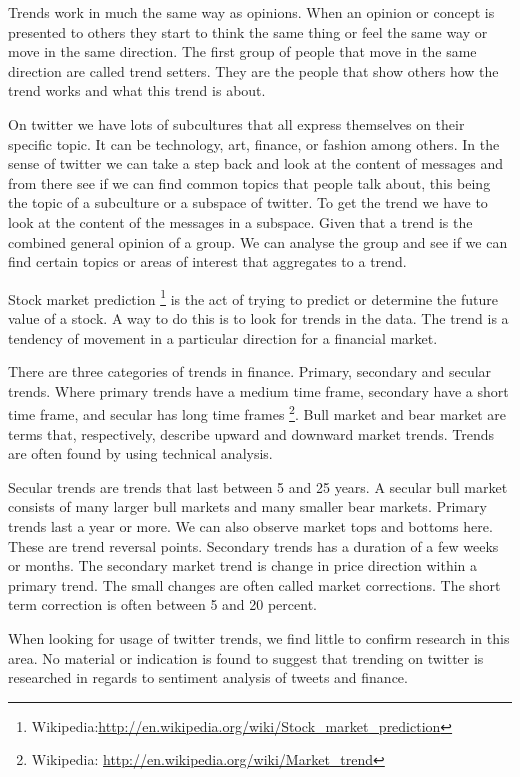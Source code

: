 Trends work in much the same way as opinions. When an opinion or concept is
presented to others they start to think the same thing or feel the same way or
move in the same direction. The first group of people that move in the same
direction are called trend setters. They are the people that show others how
the trend works and what this trend is about. 

On twitter we have lots of subcultures that all express themselves on their
specific topic. It can be technology, art, finance, or fashion among others.  
In the sense of twitter we can take a step back and look at the content of
messages and from there see if we can find common topics that people talk
about, this being the topic of a subculture or a subspace of twitter. To get
the trend we have to look at the content of the messages in a subspace. Given
that a trend is the combined general opinion of a group. We can analyse the
group and see if we can find certain topics or areas of interest that aggregates
to a trend.  

Stock market prediction
\footnote{Wikipedia:\url{http://en.wikipedia.org/wiki/Stock_market_prediction}}
is the act of trying to predict or determine the future
value of a stock. A way to do this is to look for trends in the data. The trend
is a tendency of movement in a particular direction for a financial market.

There are three categories of trends in finance. Primary, secondary and secular
trends. Where primary trends have a medium time frame, secondary have a short
time frame, and secular has long time frames \footnote{Wikipedia:
\url{http://en.wikipedia.org/wiki/Market_trend}}. Bull market and bear market
are terms that, respectively, describe upward and downward market trends. 
Trends are often found by using technical analysis.  

Secular trends are trends that last between 5 and 25 years. A secular bull
market consists of many larger bull markets and many smaller bear markets.
Primary trends last a year or more. We can also observe market tops and
bottoms here. These are trend reversal points. Secondary trends has a
duration of a few weeks or months. The secondary market trend is change in
price direction within a primary trend. The small changes are often called
market corrections. The short term correction is often between 5 and 20 percent.

When looking for usage of twitter trends, we find little to confirm research in
this area. No material or indication is found to suggest that trending on twitter
is researched in regards to sentiment analysis of tweets and finance. 

%
